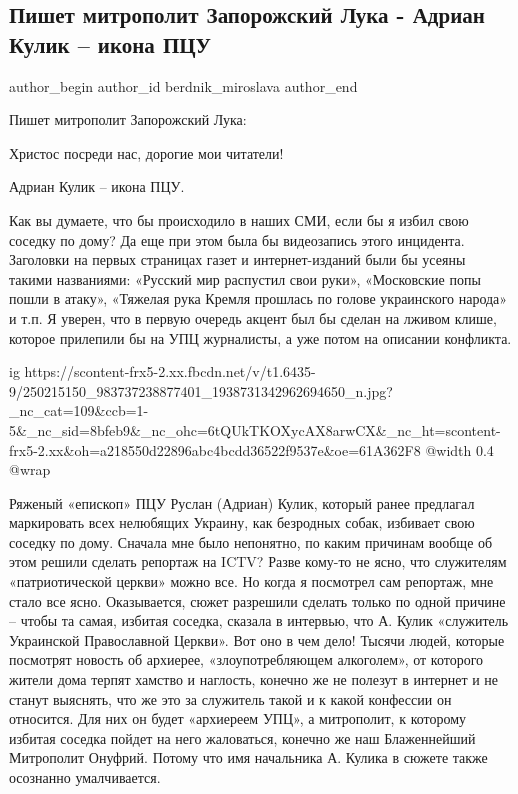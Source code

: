  
 
 
 
 
 
\subsection{Пишет митрополит Запорожский Лука - Адриан Кулик – икона ПЦУ}
\label{sec:31_10_2021.fb.berdnik_miroslava.1.pcu_adrian_kulik}
 
\ifcmt
 author_begin
   author_id berdnik_miroslava
 author_end
\fi

Пишет митрополит Запорожский Лука:

Христос посреди нас, дорогие мои читатели!

Адриан Кулик – икона ПЦУ.

Как вы думаете, что бы происходило в наших СМИ, если бы я избил свою соседку по
дому? Да еще при этом была бы видеозапись этого инцидента. Заголовки на первых
страницах газет и интернет-изданий были бы усеяны такими названиями: «Русский
мир распустил свои руки», «Московские попы пошли в атаку», «Тяжелая рука Кремля
прошлась по голове украинского народа» и т.п. Я уверен, что в первую очередь
акцент был бы сделан на лживом клише, которое прилепили бы на УПЦ журналисты, а
уже потом на описании конфликта. 

\ifcmt
  ig https://scontent-frx5-2.xx.fbcdn.net/v/t1.6435-9/250215150_983737238877401_1938731342962694650_n.jpg?_nc_cat=109&ccb=1-5&_nc_sid=8bfeb9&_nc_ohc=6tQUkTKOXycAX8arwCX&_nc_ht=scontent-frx5-2.xx&oh=a218550d22896abc4bcdd36522f9537e&oe=61A362F8
  @width 0.4
  @wrap 
\fi

Ряженый «епископ» ПЦУ Руслан (Адриан) Кулик, который ранее предлагал
маркировать всех нелюбящих Украину, как безродных собак, избивает свою соседку
по дому. Сначала мне было непонятно, по каким причинам вообще об этом решили
сделать репортаж на ICTV? Разве кому-то не ясно, что служителям «патриотической
церкви» можно все. Но когда я посмотрел сам репортаж, мне стало все ясно.
Оказывается, сюжет разрешили сделать только по одной причине – чтобы та самая,
избитая соседка, сказала в интервью, что А. Кулик «служитель Украинской
Православной Церкви». Вот оно в чем дело! Тысячи людей, которые посмотрят
новость об архиерее, «злоупотребляющем алкоголем», от которого жители дома
терпят хамство и наглость, конечно же не полезут в интернет и не станут
выяснять, что же это за служитель такой и к какой конфессии он относится. Для
них он будет «архиереем УПЦ», а митрополит, к которому избитая соседка пойдет
на него жаловаться, конечно же наш Блаженнейший Митрополит Онуфрий. Потому что
имя начальника А. Кулика в сюжете также осознанно умалчивается. 

